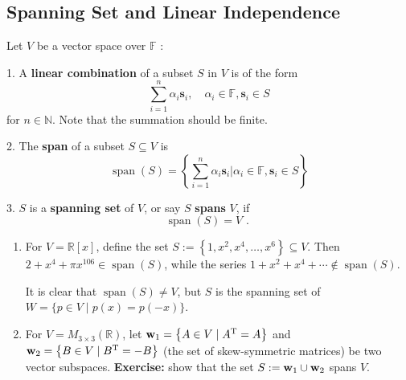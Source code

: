 \subsection{Spanning Set and Linear Independence}

\begin{definition} Let \(V\) be a vector space over \(\mathbb{F}\) :

1. A {\bf linear combination} of a subset \(S\) in \(V\) is of the form
\[
\mathop{\sum }\limits_{{i = 1}}^n\alpha_{i}{\mathbf{s}}_{i},\quad \alpha_{i} \in  \mathbb{F},{\mathbf{s}}_{i} \in  S
\]
for $n \in \mathbb{N}$. Note that the summation should be finite.

2. The {\bf span} of a subset \(S \subseteq  V\) is
\[
\operatorname{span}\left( S\right)  = \left\{  {\mathop{\sum }\limits_{{i = 1}}^n\alpha_{i}{\mathbf{s}}_{i} \Big|  \alpha_{i} \in  \mathbb{F},{\mathbf{s}}_{i} \in  S}\right\}
\]

3. \(S\) is a {\bf spanning set} of \(V\), or say \(S\) {\bf spans} \(V\), if
\[
\operatorname{span}\left( S\right)  = V\text{ . }
\]
\end{definition}

\begin{example} 
\leavevmode
\begin{enumerate}
    \item For \(V = \mathbb{R}\left\lbrack  x\right\rbrack\), define the set \(S := \left\{  {1,{x}^2,{x}^{4},\ldots ,{x}^{6}}\right\} \subseteq V\). Then \(2 + {x}^{4} + \pi {x}^{106} \in  \operatorname{span}\left( S\right)\), while the series \(1 + {x}^2 + {x}^{4} + \cdots  \notin  \operatorname{span}\left( S\right)\). 

It is clear that \(\operatorname{span}\left( S\right)  \neq  V\), but \(S\) is the spanning set of \(W = \{ p \in  V \mid  p\left( x\right)  = p\left( {-x}\right) \}\).

\item For \(V = {M}_{3 \times  3}\left( \mathbb{R}\right)\), let \({\bf w}_1 = \left\{  {A \in  V \mid  {A}^{\mathrm{T}} = A}\right\}\) and \({\bf w}_2 = \left\{  {B \in  V \mid  {B}^{\mathrm{T}} =  - B}\right\}\) (the set of skew-symmetric matrices) be two vector subspaces. {\bf Exercise:} show that the set \( S := {\bf w}_1\cup {\bf w}_2\) spans \(V\).
\end{enumerate}
\end{example}


